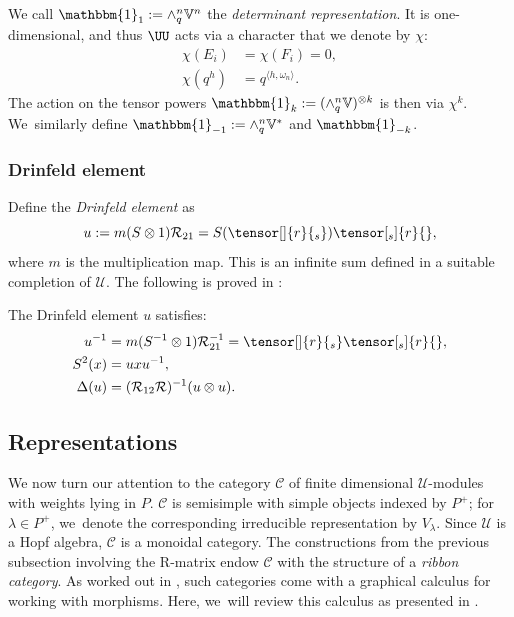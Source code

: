 We call $\mathbbm{1}_1:=\wedge^n_q\mathbb{V}^n$ the \textit{determinant representation}.
It is one-dimensional, and thus $\UU$ acts via a character that we denote by $\chi$:
\begin{equation}
\begin{aligned}
\chi(E_i)&=\chi(F_i)=0,\\
\chi(q^{h})&=q^{\langle h,\omega_n\rangle}.
\end{aligned}
\label{DetForm}
\end{equation}
The action on the tensor powers $\mathbbm{1}_k:=(\wedge^n_q\mathbb{V})^{\otimes k}$ is then via $\chi^k$. We~similarly define $\mathbbm{1}_{-1}:=\wedge_q^n\mathbb{V}^*$ and $\mathbbm{1}_{-k}$.

\subsubsection{Drinfeld element}
Define the \textit{Drinfeld element} as
\[
u:=m(S\otimes 1)\mathcal{R}_{21}=S(\tensor[]{r}{_s})\tensor[_s]{r}{},
\]
where $m$ is the multiplication map.
This is an infinite sum defined in a suitable completion of $\mathcal{U}$.
The following is proved in \cite{DrinAlmost}:
\begin{prop}
The Drinfeld element $u$ satisfies:
\begin{align}
u^{-1}&=m(S^{-1}\otimes 1)\mathcal{R}_{21}^{-1}=\tensor[]{r}{_s}\tensor[_s]{r}{}\label{DrinInv},\\
S^2(x)&=u xu^{-1}\label{DrinEle},\\
\Delta(u)&= (\mathcal{R}_{12}\mathcal{R})^{-1}(u\otimes u).\label{DrinCo}
\end{align}
\end{prop}

\subsection{Representations}\label{Reps}
We now turn our attention to the category $\mathcal{C}$ of finite dimensional $\mathcal{U}$-modules with weights lying in $P$.
$\mathcal{C}$ is semisimple with simple objects indexed by $P^+$; for $\lambda\in P^+$, we~denote the corresponding irreducible representation by $V_\lambda$.
Since $\mathcal{U}$ is a Hopf algebra, $\mathcal{C}$ is a monoidal category.
The constructions from the previous subsection involving the R-matrix endow $\mathcal{C}$ with the structure of a \textit{ribbon category}.
As worked out in \cite{ReshTurRibbon}, such categories come with a graphical calculus for working with morphisms.
Here, we~will review this calculus as presented in \cite[\S 2.3]{BakKir}.

